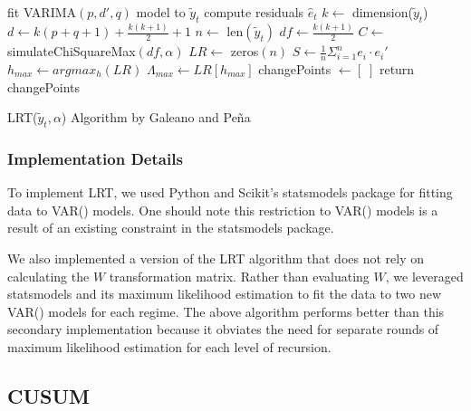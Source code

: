 \documentclass[conference,letterpaper]{IEEEtran}
\begin{document}
\begin{function}
	\SetAlgoLined
	fit VARIMA$(p, d', q)$ model to $\tilde{y}_t$ \;
	compute residuals $\hat e_t$ \;
	\BlankLine
	$k \gets$ dimension($\tilde{y}_t$) \;
	$d \gets k(p + q + 1) + \frac{k(k+1)}{2} + 1$  
	$n \gets$ len$(\tilde{y}_t)$ \;
	$df \gets \frac{k(k+1)}{2}$  
	\BlankLine
	$C \gets $ simulateChiSquareMax$(df, \alpha)$  
	\BlankLine
	$LR \gets $ zeros$(n)$ \;
	$S \gets \frac{1}{n} \Sigma_{i=1}^n e_i \cdot e_i'$ \;
	\BlankLine
	$h_{max} \gets argmax_h(LR) $ \;
	$\Lambda_{max} \gets LR[h_{max}]$ \;
	\BlankLine
	changePoints $\gets [\;]$ \;
	\BlankLine
	return changePoints
 \caption{LRT($\tilde{y}_t, \alpha$) Algorithm by Galeano and Pe\~{n}a \cite{galeano2007covariance}}
\end{function}

\subsubsection{Implementation Details}

To implement LRT, we used Python and Scikit's statsmodels package for fitting data to VAR() models.
One should note this restriction to VAR() models is a result of an existing constraint in the statsmodels package. 

We also implemented a version of the LRT algorithm that does not rely on calculating the $W$ transformation matrix.
Rather than evaluating $W$, we leveraged statsmodels and its maximum likelihood estimation to fit the data to two new VAR() models for each regime.
The above algorithm performs better than this secondary implementation because it obviates the need for separate rounds of maximum likelihood estimation for each level of recursion.

\subsection{CUSUM}
\end{document}
